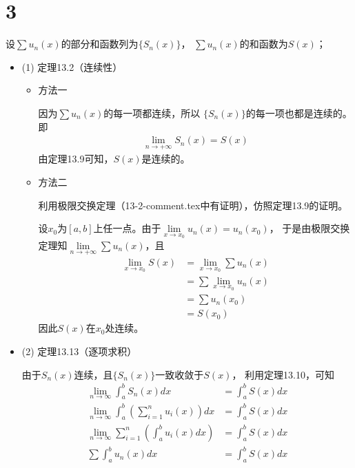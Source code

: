 \documentclass{article}
\begin{document}
\section*{3}
设$\sum u_n(x)$的部分和函数列为$\{S_n(x)\}$， $\sum u_n(x)$的和函数为$S(x)$；
\begin{itemize}
  \item (1) 定理13.2（连续性）

        \begin{itemize}
          \item 方法一

                因为$\sum u_n(x)$的每一项都连续，所以
                $\{S_n(x)\}$的每一项也都是连续的。
                即
                \begin{align*}
                  \lim\limits_{n \to +\infty} S_n(x) = S(x)
                \end{align*}
                由定理13.9可知，$S(x)$是连续的。

          \item 方法二

                利用极限交换定理（13-2-comment.tex中有证明），仿照定理13.9的证明。

                设$x_0$为$[a, b]$上任一点。由于$\lim\limits_{x \to x_0} u_n(x) = u_n(x_0)$，
                于是由极限交换定理知$\lim\limits_{n \to +\infty} \sum u_n(x)$，且
                \begin{align*}
                  \lim\limits_{x \to x_0} S(x)
                   & = \lim\limits_{x \to x_0} \sum u_n(x) \\
                   & = \sum \lim\limits_{x \to x_0} u_n(x) \\
                   & = \sum u_n(x_0)                       \\
                   & = S(x_0)
                \end{align*}
                因此$S(x)$在$x_0$处连续。

        \end{itemize}

  \item (2) 定理13.13（逐项求积）

        由于$S_n(x)$连续，且$\{S_n(x)\}$一致收敛于$S(x)$，
        利用定理13.10，可知
        \begin{align*}
          \lim\limits_{n \to \infty} \int_{a}^{b} S_n(x) dx                                    & = \int_{a}^{b} S(x) dx \\
          \lim\limits_{n \to \infty} \int_{a}^{b} \left(\sum\limits_{i = 1}^n u_i(x)\right) dx & = \int_{a}^{b} S(x) dx \\
          \lim\limits_{n \to \infty} \sum\limits_{i = 1}^n \left(\int_{a}^{b} u_i(x) dx\right) & = \int_{a}^{b} S(x) dx \\
          \sum \int_{a}^{b} u_n(x) dx                                                          & = \int_{a}^{b} S(x) dx
        \end{align*}


\end{itemize}
\end{document}
